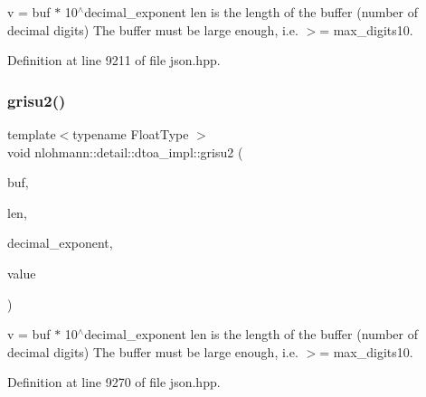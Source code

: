 v = buf $\ast$ 10$^\wedge$decimal\+\_\+exponent len is the length of the buffer (number of decimal digits) The buffer must be large enough, i.\+e. $>$= max\+\_\+digits10. 

Definition at line 9211 of file json.\+hpp.

\mbox{\label{namespacenlohmann_1_1detail_1_1dtoa__impl_aab7a9670a4f4704a5d0347ad7588576b}} 
\subsubsection{\texorpdfstring{grisu2()}{grisu2()}\hspace{0.1cm}{\footnotesize\ttfamily [2/2]}}
{\footnotesize\ttfamily template$<$typename Float\+Type $>$ \\
void nlohmann\+::detail\+::dtoa\+\_\+impl\+::grisu2 (\begin{DoxyParamCaption}\item[{char $\ast$}]{buf,  }\item[{int \&}]{len,  }\item[{int \&}]{decimal\+\_\+exponent,  }\item[{Float\+Type}]{value }\end{DoxyParamCaption})}

v = buf $\ast$ 10$^\wedge$decimal\+\_\+exponent len is the length of the buffer (number of decimal digits) The buffer must be large enough, i.\+e. $>$= max\+\_\+digits10. 

Definition at line 9270 of file json.\+hpp.

\mbox{\label{namespacenlohmann_1_1detail_1_1dtoa__impl_a9b899c72b0e1e3dd46d75c2b4e6bcdfb}} 
